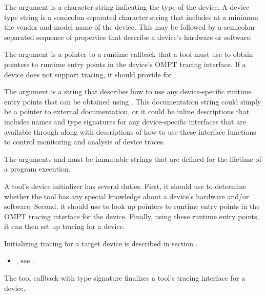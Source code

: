 The argument  is a character string indicating the
type of the device. A device type string is a semicolon separated
character string that includes at a minimum the vendor and model name
of the device. This may be followed by a semicolon-separated sequence
of properties that describe a device's hardware or software.

\devicedesc

The argument  is a pointer to a runtime callback
that a tool must use to obtain pointers to runtime entry points in the
device's OMPT tracing interface. If a device does not support tracing,
it should provide  for .

The argument  is a string that describes
how to use any device-specific runtime
entry points that can be obtained using . This
documentation string could simply be a pointer to external
documentation, or it could be inline descriptions 
that includes names and type signatures for any
device-specific interfaces that are available through 
along with descriptions of how to use these interface functions to
control monitoring and analysis of device traces.

\constraints
The arguments  and  must be
immutable strings that are defined for the lifetime of a program
execution.

\effect

A tool's device initializer has several duties.  First, it should use
 to determine whether the tool has any special knowledge
about a device's hardware and/or software.  Second, it should use
 to look up pointers to runtime entry points in the OMPT tracing
interface for the device.  Finally, using these runtime entry points, it can
then set up tracing for a device.

Initializing tracing for a target device is described in section
. 

\crossreferences
\begin{itemize}
\item {}, see
  .
\end{itemize}


\label{sec:ompt_callback_device_finalize_t}

\summary The tool callback with type signature
 finalizes a
tool's tracing interface for a device.

